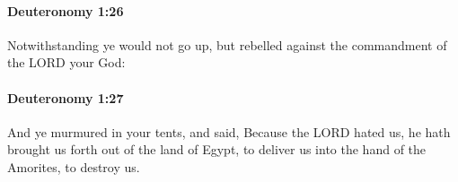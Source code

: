 		\paragraph{Deuteronomy 1:26} %
			\label{DEUTERONOMY-1-26}

			Notwithstanding ye would not go up, but rebelled against the commandment of the LORD your God:


		\paragraph{Deuteronomy 1:27} %
			\label{DEUTERONOMY-1-27}

			And ye murmured in your tents, and said, Because the LORD hated us, he hath brought us forth out of the land of Egypt, to deliver us into the hand of the Amorites, to destroy us.


